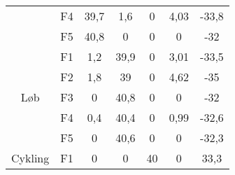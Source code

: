 \begin{table}[H]
{\begin{tabular}{ccccccc}
		& F4             & 39,7                                                                                                & 1,6                                                                                              & 0      & 4,03   & -33,8                                                                                            \\
		& F5             & 40,8                                                                                                & 0                                                                                                & 0      & 0    & -32                                                                                          \\ \hline
		\multirow{5}{*}{Løb}                                                      & F1                                                                                                          & 1,2 & 39,9                                                                                             & 0     & 3,01 & -33,5                                                                                               \\
		& F2                                                                                           & 1,8  & 39                                                                                            & 0         & 4,62     & -35                                                                                       \\
		& F3                                                                                              & 0    & 40,8                                                                                            & 0      & 0         & -32                                                                                      \\
		& F4                                                                                                      & 0,4  & 40,4                                                                                            & 0     & 0,99    & -32,6                                                                                           \\
		& F5                                                                                                    & 0     & 40,6                                                                                           & 0         & 0 & -32,3  \\ \hline
		\multirow{5}{*}{Cykling}     & F1     & 0        & 0     & 40    & 0    & 33,3  \\ 

\end{tabular}}
\end{table}
